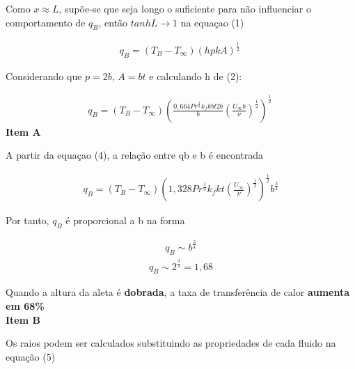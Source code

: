 \documentclass[12pt]{article}
\begin{document}
Como $x\approx L$, supõe-se que seja longo o suficiente para não influenciar o comportamento de $q_{B}$, então $tanhL\rightarrow1$ na equaçao (1)

\begin{equation}
	\begin{aligned}
		q_{B} = (T_{B} - T_{\infty})(hpkA)^{\frac{1}{2}}\  
	\end{aligned}
\end{equation}

Considerando que $p=2b$, $A=bt$ e calculando h de (2):



\begin{equation}
	\begin{aligned}
		q_{B} = (T_{B} - T_{\infty})\left(\frac{0,664Pr^{\frac{1}{3}}k_{f}kbt2b}{b}\left(\frac{U_{\infty}b}{\nu}\right)^{\frac{1}{2}}\right)^{\frac{1}{2}}\  
	\end{aligned}
\end{equation}
\textbf{Item A}

A partir da equaçao (4), a relação entre qb e b é encontrada 

\begin{equation}
	\begin{aligned}
		q_{B} = (T_{B} - T_{\infty})\left(1,328Pr^{\frac{1}{3}}k_{f}kt\left(\frac{U_{\infty}}{\nu}\right)^{\frac{1}{2}}\right)^{\frac{1}{2}} b^{\frac{3}{4}} 
	\end{aligned}
\end{equation}

Por tanto, $q_{B}$ é proporcional a b na forma

\begin{equation}
	\begin{aligned}
		q_{B} \sim b^{\frac{\scriptstyle 3}{\scriptstyle 4}}
	\end{aligned}
\end{equation}
\begin{equation}
	\begin{aligned}
		q_{B} \sim 2^{\frac{\scriptstyle 3}{\scriptstyle 4}} = 1,68
	\end{aligned}
\end{equation}

Quando a altura da aleta é \textbf{dobrada}, a taxa de transferência de calor \textbf{aumenta em 68\%}
\\

\textbf{Item B}

Os raios podem ser calculados substituindo as propriedades de cada fluido na equação (5)
\end{document}
